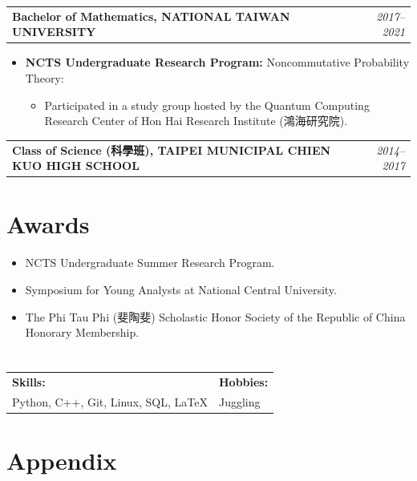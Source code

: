 \documentclass[a4paper,10pt]{article}
\begin{document}
\noindent
\begin{tabularx}{\textwidth}{Xr}
    \textbf{Bachelor of Mathematics, NATIONAL TAIWAN UNIVERSITY} & \textit{2017--2021} \\
\end{tabularx}
\begin{itemize}[leftmargin=30pt]
    \item \textbf{NCTS Undergraduate Research Program:} Noncommutative Probability Theory:
    \begin{itemize}
        \item Participated in a study group hosted by the Quantum Computing Research Center of Hon Hai Research Institute (鴻海研究院).
    \end{itemize}
\end{itemize}

\noindent
\begin{tabularx}{\textwidth}{Xr}
    \textbf{Class of Science (科學班), TAIPEI MUNICIPAL CHIEN KUO HIGH SCHOOL} & \textit{2014--2017} \\
\end{tabularx}

\section*{Awards}
\begin{itemize}[leftmargin=30pt]
    \item NCTS Undergraduate Summer Research Program.
    \item Symposium for Young Analysts at National Central University.
    \item The Phi Tau Phi (斐陶斐) Scholastic Honor Society of the Republic of China Honorary Membership.
\end{itemize}

\section*{}
\begin{tabularx}{\textwidth}{X X}
    \textbf{Skills:} & \textbf{Hobbies:} \\
    Python, C++, Git, Linux, SQL, \LaTeX & Juggling \\
\end{tabularx}

\section*{Appendix}
\end{document}
